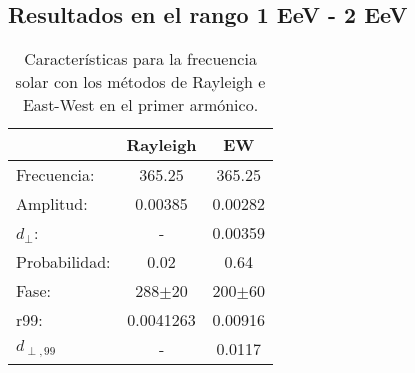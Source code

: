 \subsection*{Resultados en el rango 1 EeV - 2 EeV}
    \begin{table}[H]
        \begin{small}
            \begin{center}
                \begin{tabular}[c]{l|c|c}
                                    & Rayleigh      & EW            \\\hline
                    Frecuencia:     & 365.25	    & 365.25        \\
                    Amplitud:       & 0.00385       & 0.00282       \\
                    $d_\perp$:      & -	            & 0.00359	    \\ 
                    Probabilidad:   & 0.02          & 0.64          \\
                    Fase:           & 288$\pm$20    & 200$\pm$60    \\
                    r99:            & 0.0041263     & 0.00916       \\
                    $d_{\perp,99}$  & -             & 0.0117              \\
                \end{tabular}
            \end{center}
        \end{small}
        \caption{Características para la frecuencia solar con los métodos de Rayleigh  e East-West en el primer armónico.}
        \label{tab:solar}
    \end{table}

